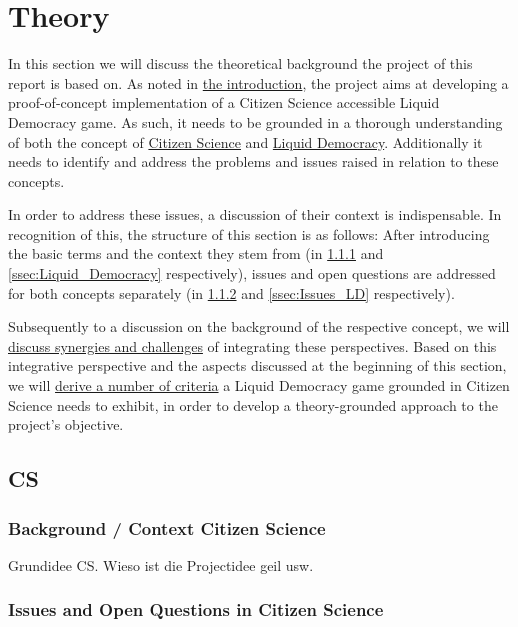 \chapter{Theory}
\label{ch:Theory}

In this section we will discuss the theoretical background the project of this report is based on. As noted in \hyperref[sec:Objective]{the introduction}, the project aims at developing a proof-of-concept implementation of a Citizen Science accessible Liquid Democracy game. As such, it needs to be grounded in a thorough understanding of both the concept of \hyperref[sec:Theory_CS]{Citizen Science} and \hyperref[sec:Liquid_Democracy]{Liquid Democracy}. Additionally it needs to identify and address the problems and issues raised in relation to these concepts. 

In order to address these issues, a discussion of their context is indispensable. In recognition of this, the structure of this section is as follows:
After introducing the basic terms and the context they stem from (in \ref{ssec:Background_CS} and \ref{ssec:Liquid_Democracy} respectively), issues and open questions are addressed for both concepts separately (in \ref{ssec:Issues_CS} and \ref{ssec:Issues_LD} respectively). 

Subsequently to a discussion on the background of the respective concept, we will \hyperref[sec:Integration_CSLD]{discuss synergies and challenges} of integrating these perspectives. Based on this integrative perspective and the aspects discussed at the beginning of this section, we will \hyperref[sec:Criteria]{derive a number of criteria} a Liquid Democracy game grounded in Citizen Science needs to exhibit, in order to develop a theory-grounded approach to the project's objective.
\section{CS}
\label{sec:Theory_CS}
\subsection{Background / Context Citizen Science}
\label{ssec:Background_CS}
Grundidee CS. Wieso ist die Projectidee geil usw.
\subsection{Issues and Open Questions in Citizen Science}
\label{ssec:Issues_CS}

\newpage

